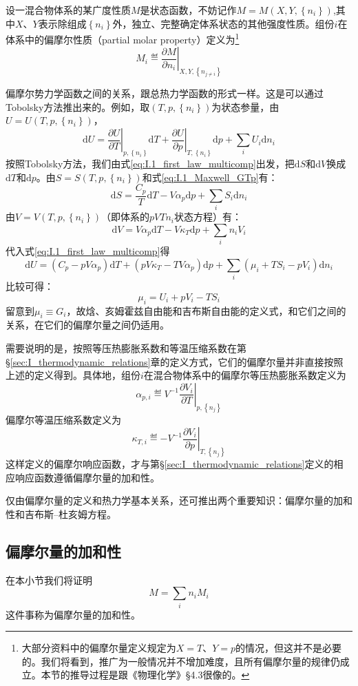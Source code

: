 \documentclass[main.tex]{subfiles}
\begin{document}
设一混合物体系的某广度性质$M$是状态函数，不妨记作$M=M\left(X,Y,\left\{n_i\right\}\right)$,其中$X$、$Y$表示除组成$\left\{n_i\right\}$外，独立、完整确定体系状态的其他强度性质。组份$i$在体系中的偏摩尔性质（partial molar property）定义为\footnote{大部分资料中的偏摩尔量定义规定为$X=T$、$Y=p$的情况，但这并不是必要的。我们将看到，推广为一般情况并不增加难度，且所有偏摩尔量的规律仍成立。本节的推导过程是跟《物理化学》\S4.3很像的。}
\[M_i\eqdef\left.\frac{\partial M}{\partial n_i}\right|_{X,Y,\left\{n_{j\neq i}\right\}}\]

偏摩尔势力学函数之间的关系，跟总热力学函数的形式一样。这是可以通过Tobolsky方法推出来的。例如，取$\left(T,p,\left\{n_i\right\}\right)$为状态参量，由$U=U\left(T,p,\left\{n_i\right\}\right)$，
\[\mathrm{d}U=\left.\frac{\partial U}{\partial T}\right|_{p,\left\{n_i\right\}}\mathrm{d}T+\left.\frac{\partial U}{\partial p}\right|_{T,\left\{n_i\right\}}\mathrm{d}p+\sum_i U_i\mathrm{d}n_i\]
按照Tobolsky方法，我们由式\eqref{eq:I.1_first_law_multicomp}出发，把$\mathrm{d}S$和$\mathrm{d}V$换成$\mathrm{d}T$和$\mathrm{d}p$。由$S=S\left(T,p,\left\{n_i\right\}\right)$和式\eqref{eq:I.1_Maxwell_GTp}有：
\[\mathrm{d}S=\frac{C_p}{T}\mathrm{d}T-V\alpha_p\mathrm{d}p+\sum_iS_i\mathrm{d}n_i\]
由$V=V\left(T,p,\left\{n_i\right\}\right)$（即体系的$pVTn_i$状态方程）有：
\[\mathrm{d}V=V\alpha_p\mathrm{d}T-V\kappa_T\mathrm{d}p+\sum_in_iV_i\]
代入式\eqref{eq:I.1_first_law_multicomp}得
\[\mathrm{d}U=\left(C_p-pV\alpha_p\right)\mathrm{d}T+\left(pV\kappa_T-TV\alpha_p\right)\mathrm{d}p+\sum_i\left(\mu_i+TS_i-pV_i\right)\mathrm{d}n_i\]
比较可得：
\[\mu_i=U_i+pV_i-TS_i\]
留意到$\mu_i\equiv G_i$，故焓、亥姆霍兹自由能和吉布斯自由能的定义式，和它们之间的关系，在它们的偏摩尔量之间仍适用。

需要说明的是，按照等压热膨胀系数和等温压缩系数在第\S\ref{sec:I_thermodynamic_relations}章的定义方式，它们的偏摩尔量并非直接按照上述的定义得到。具体地，组份$i$在混合物体系中的偏摩尔等压热膨胀系数定义为
\[\alpha_{p,i}\eqdef V^{-1}\left.\frac{\partial V_i}{\partial T}\right|_{p,\left\{n_j\right\}}\]
偏摩尔等温压缩系数定义为
\[\kappa_{T,i}\eqdef -V^{-1}\left.\frac{\partial V_i}{\partial p}\right|_{T,\left\{n_j\right\}}\]
这样定义的偏摩尔响应函数，才与第\S\ref{sec:I_thermodynamic_relations}定义的相应响应函数遵循偏摩尔量的加和性。

仅由偏摩尔量的定义和热力学基本关系，还可推出两个重要知识：偏摩尔量的加和性和吉布斯--杜亥姆方程。

\subsection{偏摩尔量的加和性}
在本小节我们将证明
\begin{equation}\label{eq:II.2_additivity_partial_molar_quantity_1}
    M=\sum_in_iM_i
\end{equation}
这件事称为偏摩尔量的加和性。
\end{document}
